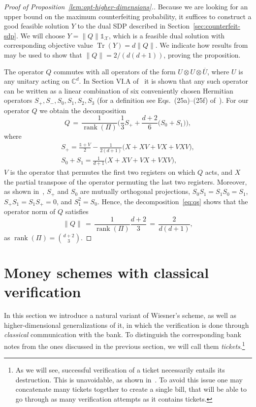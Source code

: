\documentclass[11pt,letterpaper]{article}
\theoremstyle{definition}
\newcommand{\op}[1]{\operatorname{#1}}
\newcommand{\tr}{\operatorname{Tr}}
\def\I{\mathbb{1}}
\def\complex{\mathbb{C}}
\def\X{\mathcal{X}}
\begin{document}
\begin{proof}[Proof of Proposition~\ref{lem:opt-higher-dimensions}.]
Because we are looking for an upper bound on the maximum
counterfeiting probability, it suffices to construct a good feasible
solution $Y$ to the dual SDP described in
Section~\ref{sec:counterfeit-sdp}. 
We will choose $Y = \|Q\| \I_{\X}$, which
is a feasible dual solution with corresponding objective value 
$\tr(Y) = d \|Q\|$. We indicate how results from~\cite{EggelingW01}
may be used to show that $\|Q\| = 2/(d(d+1))$, proving the
proposition.

The operator $Q$ commutes with all operators of the
form $U\otimes U \otimes \overline{U}$, where $U$ is any unitary
acting on $\complex^d$. In Section VI.A of~\cite{EggelingW01} it is shown that
any such operator can be written as a linear combination of six 
conveniently chosen
Hermitian operators $S_+,S_-,S_0,S_1,S_2,S_3$ (for a definition see
Eqs.~(25a)--(25f) of~\cite{EggelingW01}). 
For our operator $Q$ we obtain the decomposition
\begin{equation}\label{eq:qs}
Q\,=\, \frac{1}{\op{rank}(\Pi)}\Big( \frac{1}{3}S_+ + \frac{d+2}{6}
\big(S_0 + S_1\big)\Big),
\end{equation}
where 
\begin{gather*}
S_+ = \frac{\I + V}{2} - \frac{1}{2(d+1)}\big( X +XV+VX + VXV  \big),\\
S_0+S_1 = \frac{1}{d+1}\big(X+XV+VX+VXV\big),
\end{gather*}
$V$ is the operator that permutes the first two registers on which $Q$
acts, and $X$ the partial transpose of the operator permuting the last
two registers.  
Moreover, as shown in~\cite{EggelingW01}, $S_+$ and $S_0$ are mutually
orthogonal projections, $S_0 S_1 = S_1 S_0 = S_1$, 
$S_+ S_1 = S_1 S_+ = 0$, and $S_1^2 = S_0$.
Hence, the decomposition~\eqref{eq:qs} shows that the operator norm of
$Q$ satisfies  
\[
\|Q\|
\, = \,
\frac{1}{\op{rank}(\Pi)}\frac{d+2}{3}
\,=\, \frac{2}{d(d+1)},
\]
as $\op{rank}(\Pi) = \binom{d+2}{3}$. 
\end{proof}

\section{Money schemes with classical verification}
\label{sec:classical-ver}

In this section we introduce a natural variant of Wiesner's scheme, as well as
higher-dimensional generalizations of it, in which the verification is
done through \emph{classical} communication with the bank. 
To distinguish the corresponding bank notes from the ones discussed in
the previous section, we will call them \emph{tickets}.\footnote{%
  As we will see, successful verification of a ticket necessarily
  entails its destruction. 
  This is unavoidable, as shown in~\cite{Gav11}. 
  To avoid this issue one may concatenate many tickets together to
  create a single bill, that will be able to go through as many 
	verification attempts as it contains tickets.}  
\end{document}

